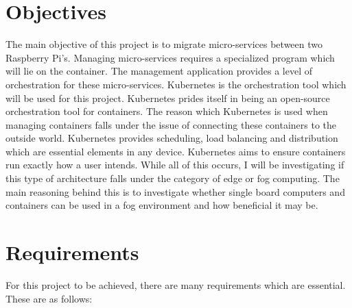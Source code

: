 

\section{Objectives}
The main objective of this project is to migrate micro-services between two Raspberry Pi's. Managing micro-services requires a specialized program which will lie on the container. The management application provides a level of orchestration for these micro-services. Kubernetes is the orchestration tool which will be used for this project. Kubernetes prides itself in being an open-source orchestration tool for containers. The reason which Kubernetes is used when managing containers falls under the issue of connecting these containers to the outside world. Kubernetes provides scheduling, load balancing and distribution which are essential elements in any device. Kubernetes aims to ensure containers run exactly how a user intends. While all of this occurs, I will be investigating if this type of architecture falls under the category of edge or fog computing. The main reasoning behind this is to investigate whether single board computers and containers can be used in a fog environment and how beneficial it may be. 

\section{ Requirements}
For this project to be achieved, there are many requirements which are essential. These are as follows:

